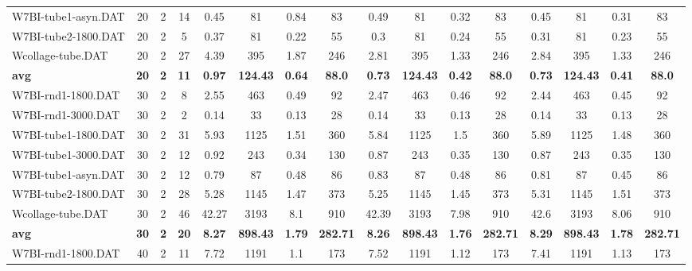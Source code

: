 \begin{sidewaystable}[!ht]
{\begin{tabular}{lccccccccccccccc}
W7BI-tube1-asyn.DAT & 20 & 2 & 14 & 0.45 & 81 & 0.84 & 83 & 0.49 & 81 & 0.32 & 83 & 0.45 & 81 &  \textcolor{blue2}{0.31} & 83 \\
W7BI-tube2-1800.DAT & 20 & 2 & 5 & 0.37 & 81 &  \textcolor{blue2}{0.22} & 55 & 0.3 & 81 & 0.24 & 55 & 0.31 & 81 & 0.23 & 55 \\
Wcollage-tube.DAT & 20 & 2 & 27 & 4.39 & 395 & 1.87 & 246 & 2.81 & 395 &  \textcolor{blue2}{1.33} & 246 & 2.84 & 395 &  \textcolor{blue2}{1.33} & 246 \\
\cline{1-16} \textbf{avg} & \textbf{20} & \textbf{2} & \textbf{11} & \textbf{0.97} & \textbf{124.43} & \textbf{0.64} & \textbf{88.0} & \textbf{0.73} & \textbf{124.43} & \textbf{0.42} & \textbf{88.0} & \textbf{0.73} & \textbf{124.43} & \textbf{0.41} & \textbf{88.0} \\ \cline{1-16}
W7BI-rnd1-1800.DAT & 30 & 2 & 8 & 2.55 & 463 & 0.49 & 92 & 2.47 & 463 & 0.46 & 92 & 2.44 & 463 &  \textcolor{blue2}{0.45} & 92 \\
W7BI-rnd1-3000.DAT & 30 & 2 & 2 & 0.14 & 33 &  \textcolor{blue2}{0.13} & 28 & 0.14 & 33 &  \textcolor{blue2}{0.13} & 28 & 0.14 & 33 &  \textcolor{blue2}{0.13} & 28 \\
W7BI-tube1-1800.DAT & 30 & 2 & 31 & 5.93 & 1125 & 1.51 & 360 & 5.84 & 1125 & 1.5 & 360 & 5.89 & 1125 &  \textcolor{blue2}{1.48} & 360 \\
W7BI-tube1-3000.DAT & 30 & 2 & 12 & 0.92 & 243 &  \textcolor{blue2}{0.34} & 130 & 0.87 & 243 & 0.35 & 130 & 0.87 & 243 & 0.35 & 130 \\
W7BI-tube1-asyn.DAT & 30 & 2 & 12 & 0.79 & 87 & 0.48 & 86 & 0.83 & 87 & 0.48 & 86 & 0.81 & 87 &  \textcolor{blue2}{0.45} & 86 \\
W7BI-tube2-1800.DAT & 30 & 2 & 28 & 5.28 & 1145 & 1.47 & 373 & 5.25 & 1145 &  \textcolor{blue2}{1.45} & 373 & 5.31 & 1145 & 1.51 & 373 \\
Wcollage-tube.DAT & 30 & 2 & 46 & 42.27 & 3193 & 8.1 & 910 & 42.39 & 3193 &  \textcolor{blue2}{7.98} & 910 & 42.6 & 3193 & 8.06 & 910 \\
\cline{1-16} \textbf{avg} & \textbf{30} & \textbf{2} & \textbf{20} & \textbf{8.27} & \textbf{898.43} & \textbf{1.79} & \textbf{282.71} & \textbf{8.26} & \textbf{898.43} & \textbf{1.76} & \textbf{282.71} & \textbf{8.29} & \textbf{898.43} & \textbf{1.78} & \textbf{282.71} \\ \cline{1-16}
W7BI-rnd1-1800.DAT & 40 & 2 & 11 & 7.72 & 1191 &  \textcolor{blue2}{1.1} & 173 & 7.52 & 1191 & 1.12 & 173 & 7.41 & 1191 & 1.13 & 173 \\

\end{tabular}}
\end{sidewaystable}
